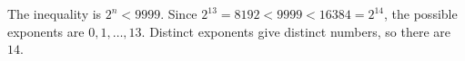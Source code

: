 The inequality is $2^n<9999$. Since $2^{13}=8192<9999<16384=2^{14}$, the possible exponents are $0,1,\ldots,13$. Distinct exponents give distinct numbers, so there are $\boxed{14}$.
